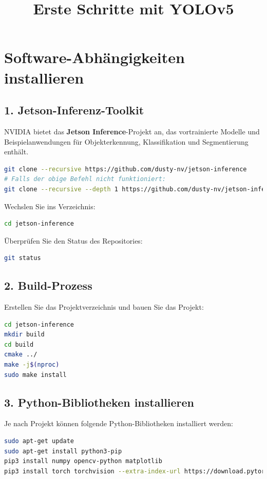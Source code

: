 \documentclass{article}
\title{Erste Schritte mit YOLOv5}
\author{}
\date{}
\begin{document}
\maketitle

\section*{Software-Abhängigkeiten installieren}

\subsection*{1. Jetson-Inferenz-Toolkit}
NVIDIA bietet das \textbf{Jetson Inference}-Projekt an, das vortrainierte Modelle und Beispielanwendungen für Objekterkennung, Klassifikation und Segmentierung enthält.

\begin{lstlisting}[language=bash]
git clone --recursive https://github.com/dusty-nv/jetson-inference
# Falls der obige Befehl nicht funktioniert:
git clone --recursive --depth 1 https://github.com/dusty-nv/jetson-inference
\end{lstlisting}

Wechslen Sie ins Verzeichnis:
\begin{lstlisting}[language=bash]
cd jetson-inference
\end{lstlisting}

Überprüfen Sie den Status des Repositories:
\begin{lstlisting}[language=bash]
git status
\end{lstlisting}

\subsection*{2. Build-Prozess}
Erstellen Sie das Projektverzeichnis und bauen Sie das Projekt:
\begin{lstlisting}[language=bash]
cd jetson-inference
mkdir build
cd build
cmake ../
make -j$(nproc)
sudo make install
\end{lstlisting}

\subsection*{3. Python-Bibliotheken installieren}
Je nach Projekt können folgende Python-Bibliotheken installiert werden:

\begin{lstlisting}[language=bash]
sudo apt-get update
sudo apt-get install python3-pip
pip3 install numpy opencv-python matplotlib
pip3 install torch torchvision --extra-index-url https://download.pytorch.org/whl/cu118
\end{lstlisting}
\end{document}
